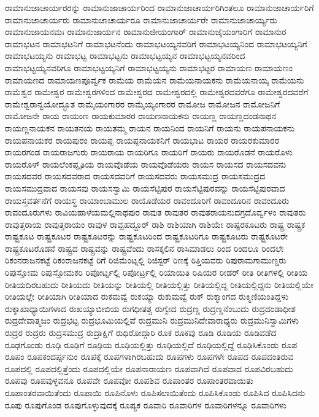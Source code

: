 {ರಾಮಾನುಜಾಚಾರ್ಯರರನ್ನು
ರಾಮಾನುಜಾಚಾರ್ಯರಿಂದ
ರಾಮಾನುಜಾಚಾರ್ಯರಿಗಿಂತಲೂ
ರಾಮಾನುಜಾಚಾರ್ಯರಿಗೆ
ರಾಮಾನುಜಾಚಾರ್ಯರು
ರಾಮಾನುಜಾಚಾರ್ಯರೂ
ರಾಮಾನುಜಾಚಾರ್ಯರೇ
ರಾಮಾನುಜಾಚಾರ್ಯ್ಯರು
ರಾಮಾನುಜಾಯನಮಃ
ರಾಮಾನುಜಾರ್ಯನ
ರಾಮಾನುಜೀಯಂಗಾರ್
ರಾಮಾನುಜೈಯಂಗಾರಿಗೆ
ರಾಮಾನುರ
ರಾಮಾಭಟನ
ರಾಮಾಭಟನಿಗೆ
ರಾಮಾಭಟನೆಂದು
ರಾಮಾಭಟಯ್ಯನವರಿಗೆ
ರಾಮಾಭಟಯ್ಯನಿಂದ
ರಾಮಾಭಟಯ್ಯನಿಗೆ
ರಾಮಾಭಟಯ್ಯನು
ರಾಮಾಭಟ್ಟ
ರಾಮಾಭಟ್ಟನು
ರಾಮಾಭಟ್ಟಯ್ಯನ
ರಾಮಾಭಟ್ಟಯ್ಯನವರಿಂದ
ರಾಮಾಭಟ್ಟಯ್ಯನವರಿಗೂ
ರಾಮಾಭಟ್ಟಯ್ಯನಿಗೆ
ರಾಮಾಭಟ್ಟಯ್ಯನು
ರಾಮಾಭಟ್ಟರ
ರಾಮಾಯಣ
ರಾಮಾಯಣಂ
ರಾಮಾಯಣದ
ರಾಮಾಯಣಪೂರ್ವ್ವಕ
ರಾಮೆಯ
ರಾಮೆಯನ
ರಾಮೆಯನಾಯಕನು
ರಾಮೆಯನಾಯ್ಕ
ರಾಮೆಯನು
ರಾಮೆಶ್ವರ
ರಾಮೇಶ್ವರ
ರಾಮೇಶ್ವರಗಳಿಂದ
ರಾಮೇಶ್ವರದ
ರಾಮೇಶ್ವರದಲ್ಲಿ
ರಾಮೇಶ್ವರದವರೆಗೂ
ರಾಮೇಶ್ವರದವರೆಗೆ
ರಾಮೇಶ್ವರಾನ್ವಯೋದ್ಭೂತ
ರಾಮೈಯಂಗಾರರ
ರಾಮೈಯ್ಯಂಗಾರರ
ರಾಮೋಜ
ರಾಮೋಜನ
ರಾಮೋಜನಿಗೆ
ರಾಮೋಜನೇ
ರಾಯ
ರಾಯಂಣ
ರಾಯಕುಮಾರರ
ರಾಯಣನಾಯಕನು
ರಾಯಣ್ಣ
ರಾಯಣ್ಣದಂಡನಾಥನ
ರಾಯಣ್ಣನಾಯಕನ
ರಾಯತನಯ
ರಾಯತಮ್ಮ
ರಾಯನ
ರಾಯನಿಂದ
ರಾಯನಿಗೆ
ರಾಯನು
ರಾಯಪನಾಯಕನು
ರಾಯಪನಾಯಕರ
ರಾಯಪುರಂ
ರಾಯಪ್ಪ
ರಾಯಪ್ಪನಾಯಕನಿಗೆ
ರಾಯಭಾಟ
ರಾಯರ
ರಾಯರಕುಮಾರರ
ರಾಯರಗಂಡ
ರಾಯರಾಜಗುರು
ರಾಯರಾಯ
ರಾಯರಿಗೂ
ರಾಯರಿಗೆ
ರಾಯರು
ರಾಯರೊಡನೆ
ರಾಯರೊಳು
ರಾಯರೊಳ್
ರಾಯಲೆಂಕಪ್ಪೃತಿಯ
ರಾಯವೊಡೆಯ
ರಾಯವೊಡೆಯರು
ರಾಯಸ
ರಾಯಸದ
ರಾಯಸದವನು
ರಾಯಸದವರ
ರಾಯಸದವರಾದ
ರಾಯಸದವರಿಗೆ
ರಾಯಸದವರು
ರಾಯಸಮುದ್ರ
ರಾಯಸಮುದ್ರದ
ರಾಯಸಮುದ್ರವಾದ
ರಾಯಸವು
ರಾಯಸಸ್ವಾಮಿ
ರಾಯಸೆಟ್ಟಿಪುರ
ರಾಯಸೆಟ್ಟಿಪುರವನ್ನು
ರಾಯಸೆಟ್ಟಿಪುರವಾದ
ರಾಯಸ್ತವರ್ತನೆಗೆ
ರಾಯಸ್ಥ
ರಾಯಾಂಬಾಮುಲ
ರಾಯೊಡೆಯರ
ರಾವಂದೂರಿಗೆ
ರಾವಂದೂರಿನ
ರಾವಂದೂರು
ರಾವಂದೂರುಗಳು
ರಾವಿಯಹಾಳೆಯಮಲ್ಲಿನಾಥಪುರ
ರಾವುತ
ರಾವುತರ
ರಾವುತರಾಯನುದಗ್ರದೊರ್ವ್ವಳಂ
ರಾವುತರು
ರಾವುತ್ತರಾಯ
ರಾವುತ್ತರಾಯಂ
ರಾವುಳ
ರಾವ್ಬಹದ್ದೂರ್
ರಾಶಿ
ರಾಶಿಯಾಗಿ
ರಾಶಿಯೇ
ರಾಷ್ಟರಕೂಟರು
ರಾಷ್ಟ್ರ
ರಾಷ್ಟ್ರಕ
ರಾಷ್ಟ್ರಕೂಟ
ರಾಷ್ಟ್ರಕೂಟರ
ರಾಷ್ಟ್ರಕೂಟರನ್ನು
ರಾಷ್ಟ್ರಕೂಟರಿಂದ
ರಾಷ್ಟ್ರಕೂಟರಿಗೂ
ರಾಷ್ಟ್ರಕೂಟರು
ರಾಷ್ಟ್ರಕೂಟರೇ
ರಾಷ್ಟ್ರಕೂಟರೊಡನೆ
ರಾಷ್ಟ್ರದ
ರಾಷ್ಟ್ರವನ್ನು
ರಾಷ್ಟ್ರವೆಂದು
ರಾಸಕ್ಕಲಿನ
ರಾಸಿಮಾಡಲು
ರಿಂದ
ರಿಂದಲೂ
ರಿಂದಲೇ
ರಿಕಂನರಾಜನಕಟ್ಟೆ
ರಿಕಂರಾಜನಕಟ್ಟೆ
ರಿಗೆ
ರಿಜಿಮೆಂಟ್ನಲ್ಲಿ
ರಿಜಿಸ್ಟರ್
ರಿಣಕ್ಕೆ
ರಿತ್ತಿಯವರು
ರಿಪುರಾಮಗಾಮುಣ್ಡರು
ರಿಪುಸ್ತೋಮ
ರಿಪುಸ್ತೋಮಕರಿ
ರಿಪೋರ್ಟ್ನಲ್ಲಿ
ರಿಪೋರ್ಟ್ರಲ್ಲಿ
ರಿಯಾಯಿತಿ
ರಿಷಿಯರ
ರೀಡರ್
ರೀತಿ
ರೀತಿಗಳಲ್ಲಿ
ರೀತಿಯ
ರೀತಿಯದಿರಬಹುದು
ರೀತಿಯದು
ರೀತಿಯನ್ನು
ರೀತಿಯಲ್ಲಿ
ರೀತಿಯಲ್ಲಿತ್ತು
ರೀತಿಯಲ್ಲಿದ್ದ
ರೀತಿಯಲ್ಲಿದ್ದನು
ರೀತಿಯಲ್ಲಿಯೇ
ರೀತಿಯಲ್ಲೇ
ರೀತಿಯಾಗಿ
ರೀತಿಯಾದ
ರುಕಮವ್ವೆ
ರುಕಯ್ಯಾ
ರುಕುಮವ್ವೆ
ರುಕ್
ರುಕ್ಮಾಂಗದ
ರುಕ್ಮಿಣಿಯಂತಿದ್ದಳು
ರುಕ್ಶಾಖಾಧ್ಯಾಯಿಗಳಾದ
ರುಖಯ್ಯಾಬೀಬಿಯ
ರುಗಧೀತಶ್ಚ
ರುಗ್ವೇದ
ರುದ್ರಣ್ಣ
ರುದ್ರಣ್ಣನೆಂಬುದು
ರುದ್ರದಂಡಾಧೀಶ
ರುದ್ರದೇವಾತ್ಮಜಂ
ರುದ್ರಭಟ್ಟ
ರುದ್ರಭೂಮಿಯಲ್ಲಿವೆ
ರುದ್ರಮುನಿ
ರುದ್ರಮುನಿದೇವಾರಾಧ್ಯರು
ರುದ್ರಮುನಿಸ್ವಾಮಿಗಳು
ರುದ್ರರ
ರುದ್ರರು
ರುದ್ರಸಮುದ್ರ
ರುದ್ರಾಕ್ಷಿಗೆ
ರುಧಿರೋದ್ಗಾರಿ
ರೂಕ
ರೂಕವು
ರೂಡಿ
ರೂಡಿಯ
ರೂಡಿವಡೆದ
ರೂಢಗೊಂಡು
ರೂಢಿ
ರೂಢಿಗೆ
ರೂಢಿಯ
ರೂಢಿಯಲ್ಲಿತ್ತು
ರೂಢಿಯಲ್ಲಿದೆ
ರೂಢಿಯಲ್ಲಿದ್ದೆ
ರೂಢಿಸಿಕೊಂಡು
ರೂಪ
ರೂಪಂ
ರೂಪಕಂದರ್ಪ್ಪನುಂ
ರೂಪಕ್ಕೆ
ರೂಪಗಳಾಗಿರಬಹುದು
ರೂಪಗಳು
ರೂಪಗಳೇ
ರೂಪದ
ರೂಪದಂತಿರುವ
ರೂಪದಲ್ಲಿ
ರೂಪದಲ್ಲಿತ್ತೆಂದು
ರೂಪದಲ್ಲಿಯೇ
ರೂಪನಾರಾಯಣ
ರೂಪವಾಗಿದೆ
ರೂಪವಾದ
ರೂಪವಿರಬಹುದು
ರೂಪವು
ರೂಪವುಳ್ಳವನೂ
ರೂಪವೇ
ರೂಪವೋ
ರೂಪಶಿವ
ರೂಪಾಂತರ
ರೂಪಾಂತರವಾಯಿತು
ರೂಪಾಂತರವಾಯಿತೆಂದು
ರೂಪಾಯಿ
ರೂಪಿನೊಳು
ರೂಪಿಸಲಾಯಿತೆಂದು
ರೂಪಿಸಿಕೊಂಡು
ರೂಪಿಸಿದ
ರೂಪಿಸಿದನು
ರೂಪು
ರೂಪುಗೊಂಡ
ರೂಪುಗೊಳ್ಳುವುದಕ್ಕೆ
ರೂಪ್ಯಕ
ರೂವಾರಿ
ರೂವಾರಿಗಳ
ರೂವಾರಿಗಳನ್ನೂ
ರೂವಾರಿಗಳು
}
